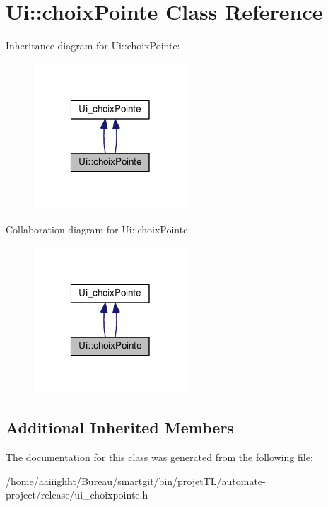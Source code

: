 \hypertarget{class_ui_1_1choix_pointe}{\section{Ui\-:\-:choix\-Pointe Class Reference}
\label{class_ui_1_1choix_pointe}
}


Inheritance diagram for Ui\-:\-:choix\-Pointe\-:
\nopagebreak
\begin{figure}[H]
\begin{center}
\leavevmode
\includegraphics[width=162pt]{class_ui_1_1choix_pointe__inherit__graph}
\end{center}
\end{figure}


Collaboration diagram for Ui\-:\-:choix\-Pointe\-:
\nopagebreak
\begin{figure}[H]
\begin{center}
\leavevmode
\includegraphics[width=162pt]{class_ui_1_1choix_pointe__coll__graph}
\end{center}
\end{figure}
\subsection*{Additional Inherited Members}


The documentation for this class was generated from the following file\-:\begin{DoxyCompactItemize}
\item 
/home/aaiiighht/\-Bureau/smartgit/bin/projet\-T\-L/automate-\/project/release/ui\-\_\-choixpointe.\-h\end{DoxyCompactItemize}

